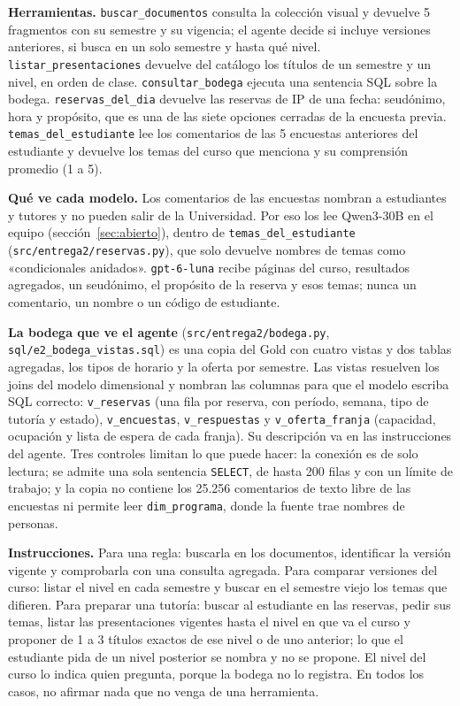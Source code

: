 \documentclass[11pt,letterpaper]{article}
\newcommand{\cod}[1]{\texttt{\small #1}}
\begin{document}
\textbf{Herramientas.} \cod{buscar\_documentos} consulta la colección visual y devuelve 5 fragmentos con su semestre y su vigencia; el agente decide si incluye versiones anteriores, si busca en un solo semestre y hasta qué nivel. \cod{listar\_presentaciones} devuelve del catálogo los títulos de un semestre y un nivel, en orden de clase. \cod{consultar\_bodega} ejecuta una sentencia SQL sobre la bodega. \cod{reservas\_del\_dia} devuelve las reservas de IP de una fecha: seudónimo, hora y propósito, que es una de las siete opciones cerradas de la encuesta previa. \cod{temas\_del\_estudiante} lee los comentarios de las 5 encuestas anteriores del estudiante y devuelve los temas del curso que menciona y su comprensión promedio (1 a 5).

\textbf{Qué ve cada modelo.} Los comentarios de las encuestas nombran a estudiantes y tutores y no pueden salir de la Universidad. Por eso los lee Qwen3-30B en el equipo (sección~\ref{sec:abierto}), dentro de \cod{temas\_del\_estudiante} (\cod{src/entrega2/reservas.py}), que solo devuelve nombres de temas como «condicionales anidados». \cod{gpt-6-luna} recibe páginas del curso, resultados agregados, un seudónimo, el propósito de la reserva y esos temas; nunca un comentario, un nombre o un código de estudiante.

\textbf{La bodega que ve el agente} (\cod{src/entrega2/bodega.py}, \cod{sql/e2\_bodega\_vistas.sql}) es una copia del Gold con cuatro vistas y dos tablas agregadas, los tipos de horario y la oferta por semestre. Las vistas resuelven los joins del modelo dimensional y nombran las columnas para que el modelo escriba SQL correcto: \cod{v\_reservas} (una fila por reserva, con período, semana, tipo de tutoría y estado), \cod{v\_encuestas}, \cod{v\_respuestas} y \cod{v\_oferta\_franja} (capacidad, ocupación y lista de espera de cada franja). Su descripción va en las instrucciones del agente. Tres controles limitan lo que puede hacer: la conexión es de solo lectura; se admite una sola sentencia \cod{SELECT}, de hasta 200 filas y con un límite de trabajo; y la copia no contiene los 25.256 comentarios de texto libre de las encuestas ni permite leer \cod{dim\_programa}, donde la fuente trae nombres de personas.

\textbf{Instrucciones.} Para una regla: buscarla en los documentos, identificar la versión vigente y comprobarla con una consulta agregada. Para comparar versiones del curso: listar el nivel en cada semestre y buscar en el semestre viejo los temas que difieren. Para preparar una tutoría: buscar al estudiante en las reservas, pedir sus temas, listar las presentaciones vigentes hasta el nivel en que va el curso y proponer de 1 a 3 títulos exactos de ese nivel o de uno anterior; lo que el estudiante pida de un nivel posterior se nombra y no se propone. El nivel del curso lo indica quien pregunta, porque la bodega no lo registra. En todos los casos, no afirmar nada que no venga de una herramienta.
\end{document}
